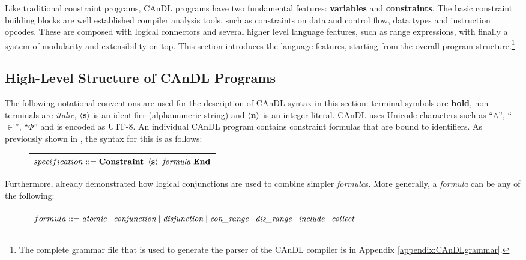     Like traditional constraint programs, CAnDL programs have two
    fundamental features: \textbf{variables} and \textbf{constraints}.
    The basic constraint building blocks are well established compiler analysis
    tools, such as constraints on data and control flow, data types and
    instruction opcodes.
    These are composed with logical connectors and several higher level language
    features, such as range expressions, with finally a system of modularity and
    extensibility on top.
    This section introduces the language features, starting from the overall
    program structure.\footnote{The complete grammar file that is used to
    generate the parser of the CAnDL compiler is in Appendix
    \ref{appendix:CAnDLgrammar}.}

\subsection{High-Level Structure of CAnDL Programs}

    The following notational conventions are used for the description of CAnDL
    syntax in this section:
    terminal symbols are {\bf bold}, non-terminals are {\it italic},
    $\left<\text{\bf s}\right>$ is an identifier (alphanumeric string) and
    $\left<\text{\bf n}\right>$ is an integer literal.
    CAnDL uses Unicode characters such as ``$\land$'', ``$\in$'', ``$\Phi$'' and
    is encoded as UTF-8.
    An individual CAnDL program contains constraint formulas that are
    bound to identifiers.
    As previously shown in , the syntax for this is as
    follows:
\begin{figure}[H]
\centering
\begin{tabular}{|c|}
    \hline
    $specification ::= \text{\bf Constraint}\ \left<\text{\bf s}\right>\ \text{\it formula}\ \text{\bf End}$\\
    \hline
\end{tabular}
\end{figure}

    \noindent
    Furthermore,  already demonstrated how logical
    conjunctions are used to combine simpler {\it formula}s.
    More generally, a {\it formula} can be any of the following:
\begin{figure}[H]
\centering
\begin{tabular}{|c|}
    \hline
    $formula ::= \text{\it atomic}\mid\text{\it conjunction}\mid\text{\it disjunction}\mid\text{\it con\_range}\mid \text{\it dis\_range}\mid\text{\it include}\mid\text{\it collect}$\\
    \hline
\end{tabular}
\end{figure}

